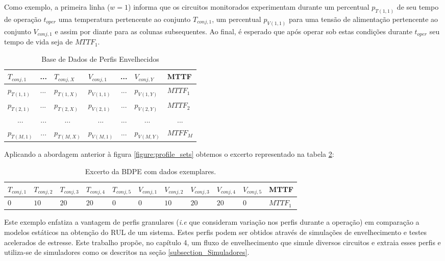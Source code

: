Como exemplo, a primeira linha ($w=1$) informa que os circuitos monitorados experimentam durante um percentual $p_{T(1,1)}$ de seu tempo de operação $t_{oper}$ uma temperatura pertencente ao conjunto $T_{conj,1}$, um percentual $p_{V(1,1)}$ para uma tensão de alimentação pertencente ao conjunto $V_{conj,1}$ e assim por diante para as colunas subsequentes. Ao final, é esperado que após operar sob estas condições durante $t_{oper}$ seu tempo de vida seja de $MTTF_1$.

\begin{table}[H]
\centering
\begin{tabular}{@{}l|l|l|l|l|l|l@{}}
\toprule
$T_{conj,1}$ & \multicolumn{1}{c}{...} & $T_{conj,X}$ & $V_{conj,1}$ & \multicolumn{1}{c}{...} & $V_{conj,Y}$ & MTTF \\ \midrule
$p_{T(1,1)}$ & ... & $p_{T(1,X)}$ & $p_{V(1,1)}$ & \multicolumn{1}{c}{...} & $p_{V(1,Y)}$ & $MTTF_1$ \\
$p_{T(2,1)}$ & ... & $p_{T(2,X)}$ & $p_{V(2,1)}$ & \multicolumn{1}{c}{...} & $p_{V(2,Y)}$ & $MTTF_2$ \\
\multicolumn{1}{c}{...} & \multicolumn{1}{c}{...} & \multicolumn{1}{c}{...} & \multicolumn{1}{c}{...} & \multicolumn{1}{c}{...} & \multicolumn{1}{c}{...} & \multicolumn{1}{c}{...} \\
$p_{T(M,1)}$ & \multicolumn{1}{c}{...} & $p_{T(M,X)}$ & $p_{V(M,1)}$ & \multicolumn{1}{c}{...} & $p_{V(M,Y)}$ & $MTFF_M$ \\ \bottomrule
\end{tabular}
\caption{Base de Dados de Perfis Envelhecidos}
\label{tb:BDPE}
\end{table}
Aplicando a abordagem anterior à figura \ref{figure:profile_sets} obtemos o excerto representado na tabela \ref{tb:BDPE_reduzida}:
\begin{table}[H]
\centering
\begin{tabular}{@{}l|l|l|l|l|l|l|l|l|l|l@{}}
\toprule
$T_{conj,1}$ & $T_{conj,2}$ & $T_{conj,3}$ & $T_{conj,4}$ & $T_{conj,5}$ & $V_{conj,1}$ & $V_{conj,2}$ & $V_{conj,3}$ & $V_{conj,4}$ & $V_{conj,5}$ & MTTF \\ \midrule
$0$ & $10$ & $20$ & $20$ & $0$ & $0$ & $10$ & $20$ & $20$ & $0$  & $MTTF_1$ \\
\bottomrule
\end{tabular}
\caption{Excerto da BDPE com dados exemplares.}
\label{tb:BDPE_reduzida}
\end{table}
Este exemplo enfatiza a vantagem de perfis granulares (\textit{i.e} que consideram variação nos perfis durante a operação) em comparação a modelos estáticos na obtenção do RUL de um sistema. Estes perfis podem ser obtidos através de simulações de envelhecimento e testes acelerados de estresse. Este trabalho propõe, no capítulo 4, um fluxo de envelhecimento que simule diversos circuitos e extraia esses perfis e utiliza-se de simuladores como os descritos na seção \ref{subsection_Simuladores}.

